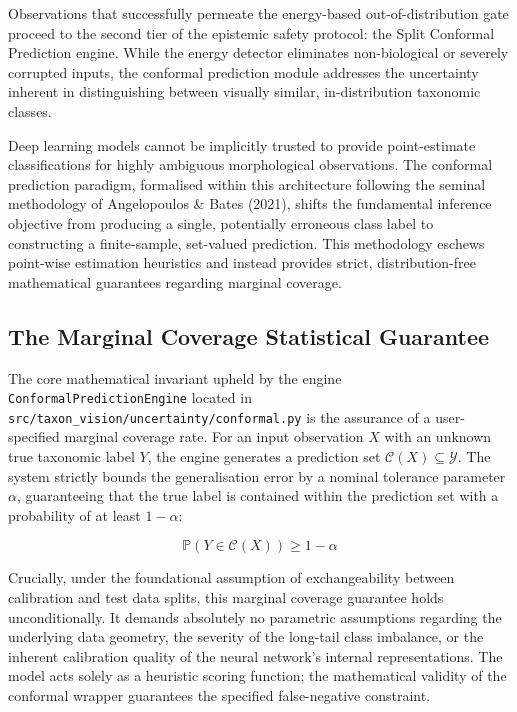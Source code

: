 Observations that successfully permeate the energy-based out-of-distribution gate proceed to the second tier of the epistemic safety protocol: the Split Conformal Prediction engine. While the energy detector eliminates non-biological or severely corrupted inputs, the conformal prediction module addresses the uncertainty inherent in distinguishing between visually similar, in-distribution taxonomic classes.

Deep learning models cannot be implicitly trusted to provide point-estimate classifications for highly ambiguous morphological observations. The conformal prediction paradigm, formalised within this architecture following the seminal methodology of Angelopoulos \& Bates (2021), shifts the fundamental inference objective from producing a single, potentially erroneous class label to constructing a finite-sample, set-valued prediction. This methodology eschews point-wise estimation heuristics and instead provides strict, distribution-free mathematical guarantees regarding marginal coverage.

\subsection{The Marginal Coverage Statistical Guarantee}

The core mathematical invariant upheld by the engine\\\texttt{ConformalPredictionEngine} located in\\\texttt{src/taxon\_vision/uncertainty/conformal.py} is the assurance of a user-specified marginal coverage rate. For an input observation $X$ with an unknown true taxonomic label $Y$, the engine generates a prediction set $\mathcal{C}(X) \subseteq \mathcal{Y}$. The system strictly bounds the generalisation error by a nominal tolerance parameter $\alpha$, guaranteeing that the true label is contained within the prediction set with a probability of at least $1 - \alpha$:

\begin{equation}
    \mathbb{P}(Y \in \mathcal{C}(X)) \ge 1 - \alpha
\end{equation}

Crucially, under the foundational assumption of exchangeability between calibration and test data splits, this marginal coverage guarantee holds unconditionally. It demands absolutely no parametric assumptions regarding the underlying data geometry, the severity of the long-tail class imbalance, or the inherent calibration quality of the neural network's internal representations. The model acts solely as a heuristic scoring function; the mathematical validity of the conformal wrapper guarantees the specified false-negative constraint.

